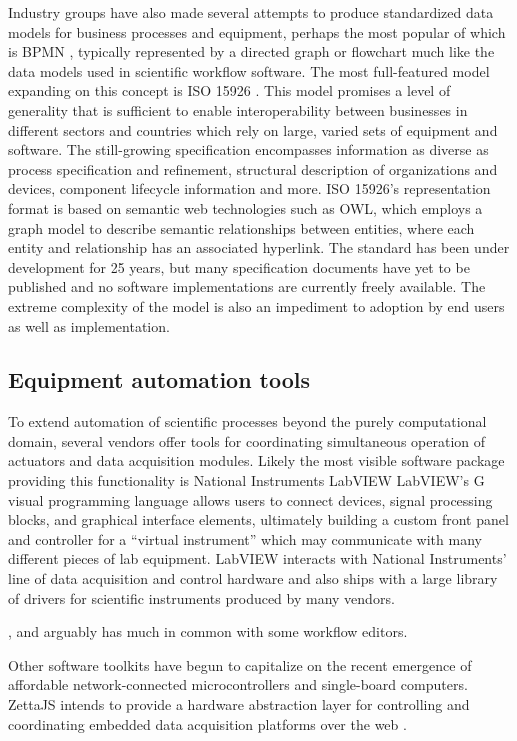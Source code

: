 \documentclass[../thesis]{subfiles}
\begin{document}
Industry groups have also made several attempts to produce
standardized data models for business processes and equipment, perhaps
the most popular of which is \gls{BPMN}
\cite{Allweyer:2010:BPM:1841147}, typically represented by a directed
graph or flowchart much like the data models used in scientific
workflow software. The
most full-featured model expanding on this concept is ISO 15926
\cite{West2009}. This model promises
a level of generality that is sufficient to enable interoperability
between businesses in different sectors and countries which rely on
large, varied sets of equipment and software. The still-growing
specification encompasses information as diverse as process
specification and refinement, structural description of organizations
and devices, component lifecycle information and more. ISO 15926's
representation format is based on semantic web technologies such as OWL, which
employs a graph model to describe semantic relationships between
entities, where each entity and relationship has an associated
hyperlink. The standard has been under development for 25 years, but
many specification documents have yet to be published and no software
implementations are currently freely available. The extreme complexity
of the model is also an impediment to adoption by end users as well as
implementation.



\subsection{Equipment automation tools}

To extend automation of scientific processes beyond the purely
computational domain, several vendors offer tools for coordinating
simultaneous operation of actuators and data acquisition modules.
Likely the most visible software package providing this functionality
is National Instruments LabVIEW \cite{ELLIOTT2007}
LabVIEW's G visual programming language allows users to connect
devices, signal processing blocks, and graphical interface elements,
ultimately building a custom front panel and controller for a
``virtual instrument'' which may communicate with many different
pieces of lab equipment. LabVIEW interacts with National Instruments'
line of data acquisition and control hardware and also ships with a
large library of drivers for scientific instruments produced by many
vendors.

, and arguably has much in common
with some workflow editors.

Other software toolkits have begun to capitalize on
the recent emergence of affordable network-connected microcontrollers
and single-board computers.
ZettaJS intends to provide a hardware abstraction layer for
controlling and coordinating embedded data acquisition platforms over
the web \cite{ZettaJS}.
\end{document}
